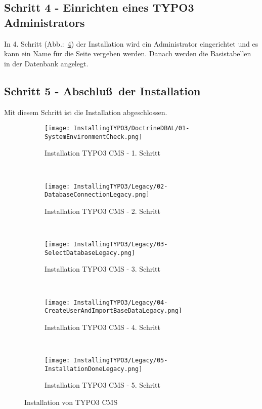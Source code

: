 \subsection{Schritt 4 - Einrichten eines TYPO3 Administrators}
\label{prototype:subsec:FourCreateAdmin}
	In 4. Schritt (Abb.:~\ref{fig:installTYPO3LegacyStepFour}) der Installation wird ein Administrator eingerichtet und es kann ein Name für die Seite vergeben werden. Danach werden die Basistabellen in der Datenbank angelegt.

\subsection{Schritt 5 - Abschlu\ss~der Installation}
\label{prototype:subsec:FiveDone}
	Mit diesem Schritt ist die Installation abgeschlossen.

\begin{figure}[H]
	\begin{subfigure}[b]{0.5\textwidth}
		\texttt{[image: InstallingTYPO3/DoctrineDBAL/01-SystemEnvironmentCheck.png]}
		\caption{Installation TYPO3 CMS - 1. Schritt}
		\label{fig:installTYPO3LegacyStepOne}
	\end{subfigure}%
	~ %
	\begin{subfigure}[b]{0.5\textwidth}
		\texttt{[image: InstallingTYPO3/Legacy/02-DatabaseConnectionLegacy.png]}
		\caption{Installation TYPO3 CMS - 2. Schritt}
		\label{fig:installTYPO3LegacyStepTwo}
	\end{subfigure}
	~ %
	\begin{subfigure}[b]{0.5\textwidth}
		\texttt{[image: InstallingTYPO3/Legacy/03-SelectDatabaseLegacy.png]}
		\caption{Installation TYPO3 CMS - 3. Schritt}
		\label{fig:installTYPO3LegacyStepThree}
	\end{subfigure}%
	~ %
	\begin{subfigure}[b]{0.5\textwidth}
		\texttt{[image: InstallingTYPO3/Legacy/04-CreateUserAndImportBaseDataLegacy.png]}
		\caption{Installation TYPO3 CMS - 4. Schritt}
		\label{fig:installTYPO3LegacyStepFour}
	\end{subfigure}
	~ %
	\begin{subfigure}[b]{0.5\textwidth}
		\texttt{[image: InstallingTYPO3/Legacy/05-InstallationDoneLegacy.png]}
		\caption{Installation TYPO3 CMS - 5. Schritt}
		\label{fig:installTYPO3LegacyStepFive}
	\end{subfigure}%
	\caption{Installation von TYPO3 CMS}
	\label{fig:installationOfTYPO3}
\end{figure}

